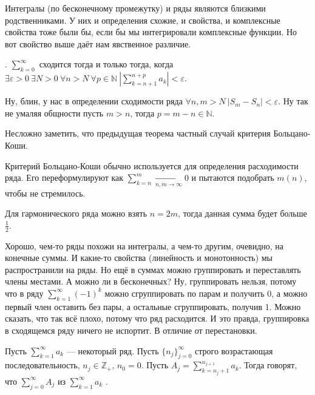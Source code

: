 \documentclass{article}
\begin{document}
\begin{itemize}
        \begin{Comment}
            Интегралы (по бесконечному промежутку) и ряды являются близкими родственниками. У них и определения схожие, и свойства, и комплексные свойства тоже были бы, если бы мы интегрировали комплексные функции. Но вот свойство выше даёт нам явственное различие.
        \end{Comment}
        \thm {}. $\sum\limits_{k=0}^\infty$ сходится тогда и только тогда, когда $\exists\varepsilon>0~\exists N>0~\forall n>N~\forall p\in\mathbb N~\left|\sum\limits_{k=n+1}^{n+p} a_k\right|<\varepsilon$.
        \begin{Proof}
            Ну, блин, у нас в определении сходимости ряда $\forall n,m>N~|S_m-S_n|<\varepsilon$. Ну так не умаляя общности пусть $m>n$, тогда $p=m-n\in\mathbb N$.
        \end{Proof}
        \begin{Comment}
            Несложно заметить, что предыдущая теорема частный случай критерия Больцано-Коши.
        \end{Comment}
        \begin{Comment}
            Критерий Больцано-Коши обычно используется для определения расходимости ряда. Его переформулируют как $\sum\limits_{k=n}^m\underset{n,m\to\infty}\rightarrow0$ и пытаются подобрать $m(n)$, чтобы не стремилось.
        \end{Comment}
        \begin{Example}
            Для гармонического ряда можно взять $n=2m$, тогда данная сумма будет больше $\frac12$.
        \end{Example}
        \begin{Comment}
            Хорошо, чем-то ряды похожи на интегралы, а чем-то другим, очевидно, на конечные суммы. И какие-то свойства (линейность и монотонность) мы распространили на ряды. Но ещё в суммах можно группировать и переставлять члены местами. А можно ли в бесконечных? Ну, группировать нельзя, потому что в ряду $\sum\limits_{k=1}^\infty(-1)^k$ можно сгруппировать по парам и получить 0, а можно первый член оставить без пары, а остальные сгруппировать, получив 1. Можно сказать, что так всё плохо, потому что ряд расходится. И это правда, группировка в сходящемся ряду ничего не испортит. В отличие от перестановки.
        \end{Comment}
        \dfn Пусть $\sum\limits_{k=1}^\infty a_k$ --- некоторый ряд. Пусть $\{n_j\}_{j=0}^\infty$ строго возрастающая последовательность, $n_j\in\mathbb Z_+$, $n_0=0$. Пусть $A_j=\sum\limits_{k=n_j+1}^{n_{j+1}}a_k$. Тогда говорят, что $\sum\limits_{j=0}^\infty A_j$  из $\sum\limits_{k=1}^\infty a_k$ .

\end{itemize}
\end{document}
